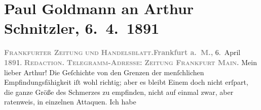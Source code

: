 

         
         \renewcommand{\erwaehntePersonen}{Personen: Richard Beer-Hofmann, Paul Goldmann, Clementine Goldmann, Hugo von Hofmannsthal, Fedor Mamroth, Leopold Sonnemann, Leo Van-Jung, Boris Van-Jung}
         \renewcommand{\erwaehnteInstitutionen}{Institutionen: Frankfurter Zeitung}
         \renewcommand{\erwaehnteOrte}{Orte: Frankfurt am Main, Preußen, Sibirien, Wien}
         \renewcommand{\erwaehnteWerke}{Werke: Tagebuch}
               \section[Paul Goldmann an Arthur Schnitzler, 6. 4. 1891]{ Paul Goldmann an Arthur Schnitzler, 6. 4. 1891}\nopagebreak{}\rehead{ }\begin{ledgroupsized}[t]{13cm}\normalsize\beginnumbering{} \toendnotes[C]{\smallbreak\pagebreak[2]} 
\toendnotes[C]{\smallbreak}\pstart
           \noindent{}{\pb}\textcolor{gray}{\textbf{\textsc{Frankfurter Zeitung}}}\pend
           \pstart
           \textcolor{gray}{\textbf{\textsc{und}}}\pend
           \pstart
           \textcolor{gray}{\textbf{\textsc{Handelsblatt.}}}\hfill \textcolor{gray}{\textbf{Frankfurt a. M., }}6. April \textcolor{gray}{\textbf{189}}1.\pend
           \pstart
           \textcolor{gray}{\textbf{\textbf{\textsc{Redaction.}}}}\pend
           \pstart
           \textcolor{gray}{\textbf{\textbf{\textsc{Telegramm-Adresse:}}}}\pend
           \pstart
           \textcolor{gray}{\textbf{\textbf{\textsc{Zeitung Frankfurt
                              Main.}}}}\pend
           \pstart\center{}Mein lieber Arthur!\pend\pstart
           Die Geſchichte von den Grenzen der menſchlichen Empfindungsfähigkeit iſt wohl
               richtig; aber es bleibt Einem doch nicht erſpart, die ganze Größe des Schmerzes zu
               empfinden, nicht auf einmal zwar, aber ratenweis, in einzelnen Attaquen. Ich habe

\end{ledgroupsized}
